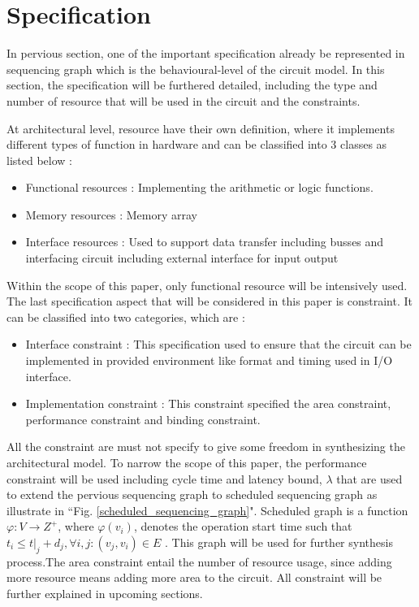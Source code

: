 \section{Specification}

In pervious section, one of the important specification already be represented in sequencing graph which is the behavioural-level of the circuit model. In this section, the specification will be furthered detailed, including the type and number of resource that will be used in the circuit and the constraints.

At architectural level, resource have their own definition, where it implements different types of function in hardware and can be classified into 3 classes as listed below \cite{main}:

\begin{itemize}
    \item Functional resources : Implementing the arithmetic or logic functions. 
    \item Memory resources : Memory array
    \item Interface resources  : Used to support data transfer including busses and interfacing circuit including external interface for input output
\end{itemize}

Within the scope of this paper, only functional resource will be intensively used. The last specification aspect that will be considered in this paper is constraint. It can be classified into two categories, which are \cite{main}:

\begin{itemize}
    \item Interface constraint : This specification used to ensure that the circuit can be implemented in provided environment like format and timing used in I/O interface.
    \item Implementation constraint : This constraint specified the area constraint, performance constraint and binding constraint.
\end{itemize}

All the constraint are must not specify to give some freedom in synthesizing the architectural model. To narrow the scope of this paper,  the performance constraint will be used including cycle time and latency bound, $\lambda$ that are used to extend the pervious sequencing graph to scheduled sequencing graph as illustrate in ``Fig. \ref{scheduled_sequencing_graph}". Scheduled graph is a function $\varphi : V \xrightarrow{} Z^{+}$, where $\varphi(v_{i})$, denotes the operation start time such that $t_{i} \leq t|_{j} + d_{j}, \forall{i,j}:(v_{j},v_{i}) \in E$ \cite{main}. This graph will be used for further synthesis process.The area constraint entail the number of resource usage, since adding more resource means adding more area to the circuit. All constraint will be further explained in upcoming sections.
 
